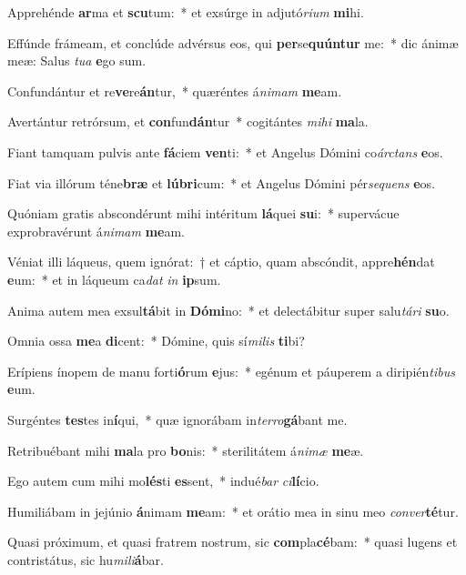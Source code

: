 \item Apprehénde \textbf{ar}ma et \textbf{scu}tum:~* et exsúrge in adjutó\textit{ri}\textit{um} \textbf{mi}hi.
\item Effúnde frámeam, et conclúde advérsus eos, qui \textbf{per}se\textbf{quún}\textbf{tur} me:~* dic ánimæ meæ: Salus \textit{tu}\textit{a} \textbf{e}go sum.
\item Confundántur et re\textbf{ve}re\textbf{án}tur,~* quæréntes á\textit{ni}\textit{mam} \textbf{me}am.
\item Avertántur retrórsum, et \textbf{con}fun\textbf{dán}tur~* cogitántes \textit{mi}\textit{hi} \textbf{ma}la.
\item Fiant tamquam pulvis ante \textbf{fá}ciem \textbf{ven}ti:~* et Angelus Dómini co\textit{árc}\textit{tans} \textbf{e}os.
\item Fiat via illórum téne\textbf{bræ} et \textbf{lú}\textbf{bri}cum:~* et Angelus Dómini pér\textit{se}\textit{quens} \textbf{e}os.
\item Quóniam gratis abscondérunt mihi intéritum \textbf{lá}quei \textbf{su}i:~* supervácue exprobravérunt á\textit{ni}\textit{mam} \textbf{me}am.
\item Véniat illi láqueus, quem ignórat:~† et cáptio, quam abscóndit, appre\textbf{hén}dat \textbf{e}um:~* et in láqueum ca\textit{dat} \textit{in} \textbf{ip}sum.
\item Anima autem mea exsul\textbf{tá}bit in \textbf{Dó}\textbf{mi}no:~* et delectábitur super salu\textit{tá}\textit{ri} \textbf{su}o.
\item Omnia ossa \textbf{me}a \textbf{di}cent:~* Dómine, quis sí\textit{mi}\textit{lis} \textbf{ti}bi?
\item Erípiens ínopem de manu forti\textbf{ó}rum \textbf{e}jus:~* egénum et páuperem a diripién\textit{ti}\textit{bus} \textbf{e}um.
\item Surgéntes \textbf{tes}tes in\textbf{í}qui,~* quæ ignorábam in\textit{ter}\textit{ro}\textbf{gá}bant me.
\item Retribuébant mihi \textbf{ma}la pro \textbf{bo}nis:~* sterilitátem á\textit{ni}\textit{mæ} \textbf{me}æ.
\item Ego autem cum mihi mo\textbf{lés}ti \textbf{es}sent,~* indué\textit{bar} \textit{ci}\textbf{lí}cio.
\item Humiliábam in jejúnio \textbf{á}nimam \textbf{me}am:~* et orátio mea in sinu meo \textit{con}\textit{ver}\textbf{té}tur.
\item Quasi próximum, et quasi fratrem nostrum, sic \textbf{com}pla\textbf{cé}bam:~* quasi lugens et contristátus, sic hu\textit{mi}\textit{li}\textbf{á}bar.
